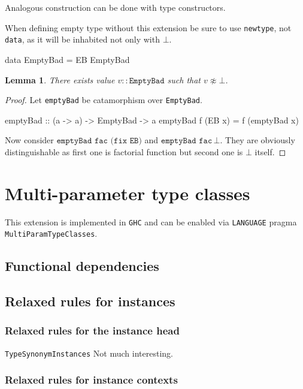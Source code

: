 \documentclass[11pt,oneside,draft]{fithesis2}
\newtheorem{lemma}{Lemma}
\begin{document}
Analogous construction can be done with type constructors.

When defining empty type without this extension be sure to use
\texttt{newtype}, not \texttt{data}, as it will be inhabited not only with \(\bot\).
\begin{code}
data EmptyBad = EB EmptyBad
\end{code}

\begin{lemma}
There exists value \(v :: \texttt{EmptyBad}\) such that \(v \not \approx \bot\).
\end{lemma}

\begin{proof}
Let \texttt{emptyBad} be catamorphism over \texttt{EmptyBad}.
\begin{code}
emptyBad :: (a -> a) -> EmptyBad -> a
emptyBad f (EB x) = f (emptyBad x)
\end{code}
Now consider \(\texttt{emptyBad fac (fix EB)}\) and \(\texttt{emptyBad fac} \, \bot\).
They are obviously distinguishable as first one is factorial function but second one is \(\bot\) itself.
\end{proof}

\section{Multi-parameter type classes}

This extension is implemented in \texttt{GHC} and can be enabled via
\texttt{LANGUAGE} pragma \texttt{MultiParamTypeClasses}.

\subsection{Functional dependencies}

\subsection{Relaxed rules for instances}

\subsubsection{Relaxed rules for the instance head}

\texttt{TypeSynonymInstances} Not much interesting.

\subsubsection{Relaxed rules for instance contexts}
\end{document}
